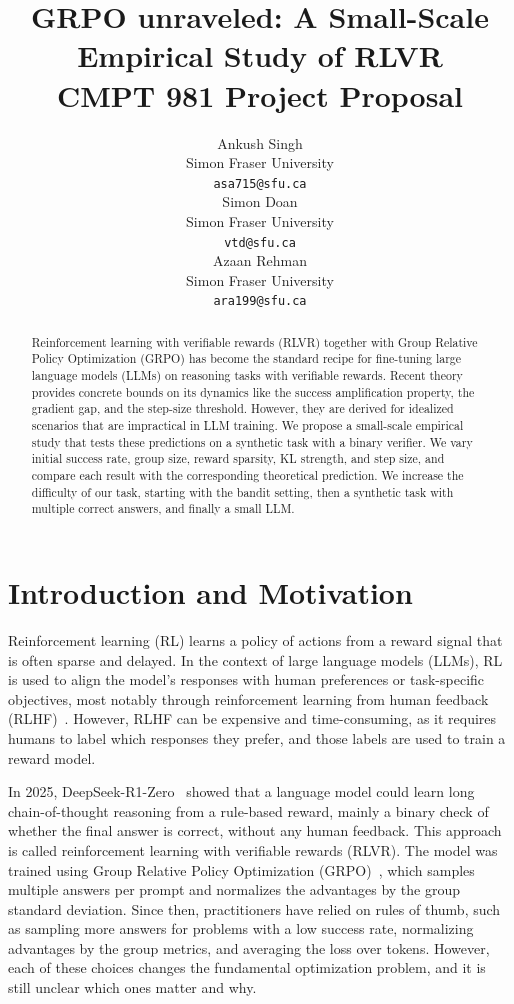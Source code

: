 \documentclass{article}
\title{GRPO unraveled: A Small-Scale Empirical Study of RLVR\\
  CMPT 981 Project Proposal}
\author{%
  Ankush Singh\\
  Simon Fraser University\\
  \texttt{asa715@sfu.ca} \\
  \And
  Simon Doan\\
  Simon Fraser University\\
  \texttt{vtd@sfu.ca} \\
  \And
  Azaan Rehman\\
  Simon Fraser University\\
  \texttt{ara199@sfu.ca} \\
}
\theoremstyle{definition}
\newcommand{\1}{\mathbf{1}}
\begin{document}
\maketitle

\begin{abstract}
  Reinforcement learning with verifiable rewards (RLVR) together with Group
  Relative Policy Optimization (GRPO) has become the standard recipe for
  fine-tuning large language models (LLMs) on reasoning tasks with verifiable
  rewards. Recent theory provides concrete bounds on its dynamics like the
  success amplification property, the gradient gap, and the step-size threshold.
  However, they are derived for idealized scenarios that are impractical in LLM
  training. We propose a small-scale empirical study that tests these predictions
  on a synthetic task with a binary verifier. We vary initial success rate,
  group size, reward sparsity, KL strength, and step size, and compare each
  result with the corresponding theoretical prediction. We increase the difficulty
  of our task, starting with the bandit setting, then a synthetic task with
  multiple correct answers, and finally a small LLM.
\end{abstract}

\section{Introduction and Motivation}
\label{sec:intro}

Reinforcement learning (RL) learns a policy of actions from a reward signal
that is often sparse and delayed. In the context of large language models
(LLMs), RL is used to align the model's responses with human preferences or
task-specific objectives, most notably through reinforcement learning from
human feedback (RLHF)~\citep{ouyang2022instructgpt}. However, RLHF can be
expensive and time-consuming, as it requires humans to label which responses
they prefer, and those labels are used to train a reward model.

In 2025, DeepSeek-R1-Zero~\citep{guo2025deepseekr1} showed that a language
model could learn long chain-of-thought reasoning from a rule-based reward,
mainly a binary check of whether the final answer is correct, without any
human feedback. This approach is called reinforcement learning with
verifiable rewards (RLVR). The model was trained using Group Relative Policy
Optimization (GRPO)~\citep{shao2024deepseekmath}, which samples multiple
answers per prompt and normalizes the advantages by the group standard
deviation. Since then, practitioners have relied on rules of thumb, such as
sampling more answers for problems with a low success rate, normalizing
advantages by the group metrics, and averaging the loss over tokens.
However, each of these choices changes the fundamental optimization problem,
and it is still unclear which ones matter and why.
\end{document}
